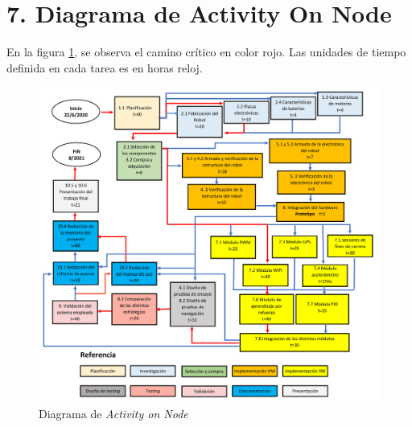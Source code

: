 \documentclass[11pt]{charter}
\begin{document}
\section{7. Diagrama de Activity On Node}
\label{sec:AoN}
En la figura \ref{fig:AoN}, se observa el camino crítico en color rojo. Las unidades de tiempo definida en cada tarea es en horas reloj. 
\begin{figure}[htpb]
\centering 
\includegraphics[width=.8\textwidth]{./Figuras/AoN.png}
\caption{Diagrama de \textit{Activity on Node}}
\label{fig:AoN}
\end{figure}
\vspace{2em}
\end{document}
